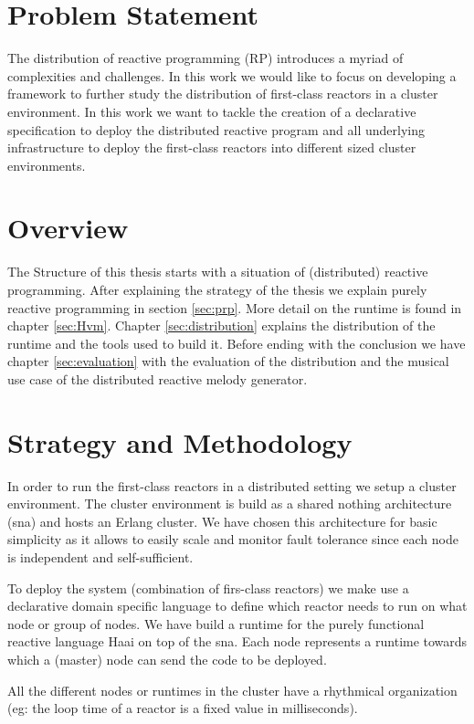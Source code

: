 \documentclass[a4paper]{book}
\begin{document}
\section{Problem Statement}
The distribution of reactive programming (RP) introduces a myriad of complexities and challenges. In this work we would like to focus on developing a framework to further study the distribution of first-class reactors in a cluster environment. In this work we want to tackle the creation of a declarative specification to deploy the distributed reactive program and all underlying infrastructure to deploy the first-class reactors into different sized cluster environments.  

\section{Overview}
The Structure of this thesis starts with a situation of (distributed) reactive programming. After explaining the strategy of the thesis we explain purely reactive programming in section \ref{sec:prp}. More detail on the runtime is found in chapter \ref{sec:Hvm}. Chapter \ref{sec:distribution} explains the distribution of the runtime and the tools used to build it. Before ending with the conclusion we have chapter \ref{sec:evaluation} with the evaluation of the distribution and the musical use case of the distributed reactive melody generator. 

\section{Strategy and Methodology}

In order to run the first-class reactors in a distributed setting we setup a cluster environment. The cluster environment is build as a shared nothing architecture (sna) and hosts an Erlang cluster. We have chosen this architecture for basic simplicity as it allows to easily scale and monitor fault tolerance since each node is independent and self-sufficient.

To deploy the system (combination of firs-class reactors) we make use a declarative domain specific language to define which reactor needs to run on what node or group of nodes. We have build a runtime for the purely functional reactive language Haai on top of the sna. Each node represents a runtime towards which a (master) node can send the code to be deployed.

All the different nodes or runtimes in the cluster have a rhythmical organization (eg: the loop time of a reactor is a fixed value in milliseconds).   
\end{document}
